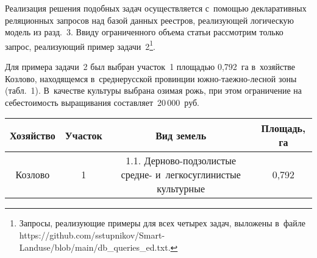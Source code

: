 \begin{multicols}{2}
    Реализация решения подобных задач осуществляется с~по\-мощью 
декларативных реляционных запросов над базой данных реестров, 
ре\-а\-ли\-зу\-ющей логическую модель из разд.~3. Ввиду ограниченного объема 
статьи рас\-смот\-рим только запрос, ре\-а\-ли\-зу\-ющий пример 
задачи~2\footnote{Запросы, реализующие примеры для всех четырех задач, 
выложены в~файле {\sf https://github.com/sstupnikov/Smart-Landuse/blob/main/db\_queries\_ed.txt.}}.


    
 Для примера задачи~2 был выбран учас\-ток~1 пло\-щадью 0,792~га 
в~хозяйстве Козлово, находящемся в~среднерусской провинции  
юж\-но-та\-еж\-но-\linebreak лес\-ной зоны (табл.~1). В~качестве культуры вы\-бра\-на
озимая рожь, при этом ограничение на се\-бе\-сто\-и\-мость выращивания 
со\-став\-ля\-ет~20\,000~руб. %


    

\end{multicols}

\setcounter{table}{0}
\begin{table*}[h]\small %
\vspace*{-12pt}
    \begin{center}
     \vspace*{2ex}
     
     \begin{tabular}{|c|c|c|c|}
     \hline
\textbf{Хозяйство}&\textbf{Участок}&\textbf{Вид земель}&\textbf{Площадь, га}\\
\hline
Козлово&1&1.1. Дерново-подзолистые средне- и~легкосуглинистые культурные&0,792\\
\hline
\end{tabular}
\end{center}
\end{table*}

\pagebreak



